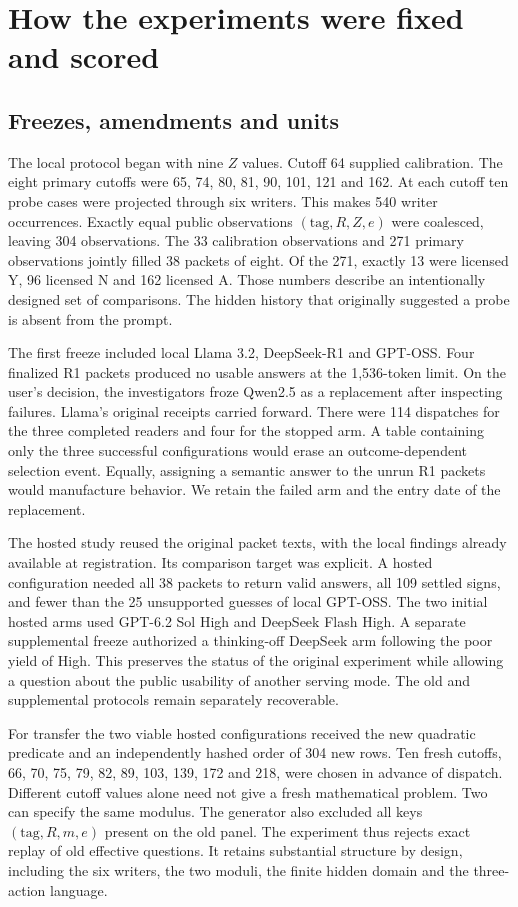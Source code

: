 \documentclass[12pt,letterpaper]{article}
\begin{document}
\section{How the experiments were fixed and scored}\label{sec:design}
\subsection{Freezes, amendments and units}
The local protocol began with nine $Z$ values. Cutoff 64 supplied calibration. The eight primary cutoffs were 65, 74, 80, 81, 90, 101, 121 and 162. At each cutoff ten probe cases were projected through six writers. This makes 540 writer occurrences. Exactly equal public observations $(\mathrm{tag},R,Z,e)$ were coalesced, leaving 304 observations. The 33 calibration observations and 271 primary observations jointly filled 38 packets of eight. Of the 271, exactly 13 were licensed Y, 96 licensed N and 162 licensed A. Those numbers describe an intentionally designed set of comparisons. The hidden history that originally suggested a probe is absent from the prompt.

The first freeze included local Llama 3.2, DeepSeek-R1 and GPT-OSS. Four finalized R1 packets produced no usable answers at the 1,536-token limit. On the user's decision, the investigators froze Qwen2.5 as a replacement after inspecting failures. Llama's original receipts carried forward. There were 114 dispatches for the three completed readers and four for the stopped arm. A table containing only the three successful configurations would erase an outcome-dependent selection event. Equally, assigning a semantic answer to the unrun R1 packets would manufacture behavior. We retain the failed arm and the entry date of the replacement.

The hosted study reused the original packet texts, with the local findings already available at registration. Its comparison target was explicit. A hosted configuration needed all 38 packets to return valid answers, all 109 settled signs, and fewer than the 25 unsupported guesses of local GPT-OSS. The two initial hosted arms used GPT-6.2 Sol High and DeepSeek Flash High. A separate supplemental freeze authorized a thinking-off DeepSeek arm following the poor yield of High. This preserves the status of the original experiment while allowing a question about the public usability of another serving mode. The old and supplemental protocols remain separately recoverable.

For transfer the two viable hosted configurations received the new quadratic predicate and an independently hashed order of 304 new rows. Ten fresh cutoffs, 66, 70, 75, 79, 82, 89, 103, 139, 172 and 218, were chosen in advance of dispatch. Different cutoff values alone need not give a fresh mathematical problem. Two can specify the same modulus. The generator also excluded all keys $(\mathrm{tag},R,m,e)$ present on the old panel. The experiment thus rejects exact replay of old effective questions. It retains substantial structure by design, including the six writers, the two moduli, the finite hidden domain and the three-action language.
\end{document}
